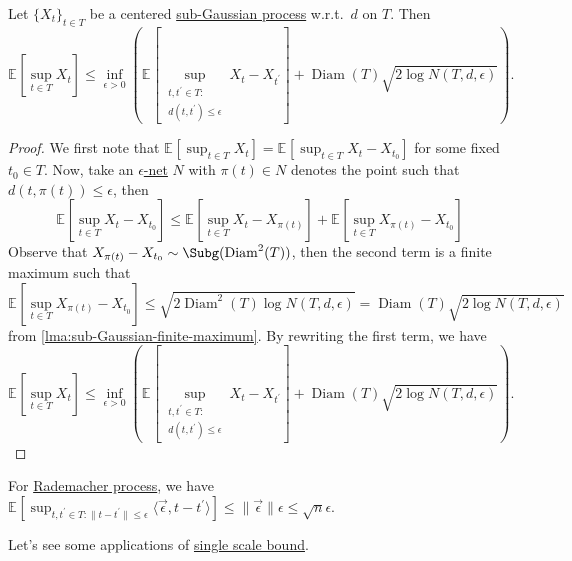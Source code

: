 \begin{lemma}\label{lma:single-scale-bound}
	Let \(\{ X_t \} _{t\in T}\) be a centered \hyperref[def:sub-Gaussian-process]{sub-Gaussian process} w.r.t.\ \(d\) on \(T\). Then
	\[
		\mathbb{E}_{}\left[\sup _{t\in T} X_t \right]
		\leq \inf _{\epsilon > 0} \left( \mathbb{E}_{}\left[\sup _{\substack{t, t^{\prime} \in T\colon \\ d(t, t^{\prime} ) \leq \epsilon }} X_t - X_{t^{\prime} } \right] + \mathop{\mathrm{Diam}}(T) \sqrt{2 \log N(T, d, \epsilon )} \right) .
	\]
\end{lemma}
\begin{proof}
	We first note that \(\mathbb{E}_{}\left[\sup _{t\in T} X_t \right] = \mathbb{E}_{}\left[\sup _{t\in T} X_t - X_{t_0} \right]  \) for some fixed \(t_0\in T\). Now, take an \hyperref[def:eps-net]{\(\epsilon\)-net} \(N\) with \(\pi (t) \in N\) denotes the point such that \(d(t, \pi (t)) \leq \epsilon \), then
	\[
		\mathbb{E}_{}\left[\sup _{t\in T} X_t - X_{t_0} \right]
		\leq \mathbb{E}_{}\left[\sup _{t\in T} X_t - X_{\pi (t)} \right] + \mathbb{E}_{}\left[\sup _{t\in T} X_{\pi (t)} - X_{t_0} \right]
	\]
	Observe that \(X_{\pi (t)} - X_{t_0} \sim \Subg(\mathop{\mathrm{Diam}}^2(T) )\), then the second term is a finite maximum such that
	\[
		\mathbb{E}_{}\left[\sup _{t\in T} X_{\pi (t)} - X_{t_0} \right]
		\leq \sqrt{2 \mathop{\mathrm{Diam}}\nolimits^2(T) \log N(T, d, \epsilon )}
		= \mathop{\mathrm{Diam}}(T) \sqrt{2 \log N(T, d, \epsilon )}
	\]
	from \autoref{lma:sub-Gaussian-finite-maximum}. By rewriting the first term, we have
	\[
		\mathbb{E}_{}\left[\sup _{t\in T} X_t \right]
		\leq \inf _{\epsilon > 0} \left( \mathbb{E}_{}\left[\sup _{\substack{t, t^{\prime} \in T\colon \\ d(t, t^{\prime} ) \leq \epsilon }} X_t - X_{t^{\prime} } \right] + \mathop{\mathrm{Diam}}(T) \sqrt{2 \log N(T, d, \epsilon )} \right) .
	\]
\end{proof}

\begin{eg}
	For \hyperref[eg:Rademacher-process]{Rademacher process}, we have \(\mathbb{E}_{}\left[\sup _{t, t^{\prime} \in T \colon \lVert t - t^{\prime} \rVert \leq \epsilon } \langle \vec{\epsilon} , t - t^{\prime}  \rangle  \right] \leq \lVert \vec{\epsilon} \rVert \epsilon \leq \sqrt{n} \epsilon  \).
\end{eg}

Let's see some applications of \hyperref[lma:single-scale-bound]{single scale bound}.

